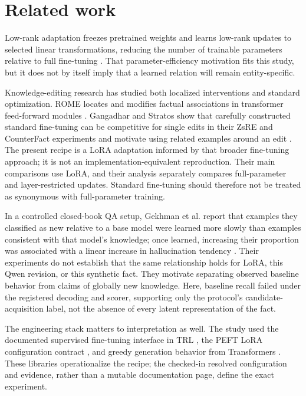 \section{Related work}
\label{sec:related-work}

Low-rank adaptation freezes pretrained weights and learns low-rank updates to
selected linear transformations, reducing the number of trainable parameters
relative to full fine-tuning \citep{hu2021lora}. That parameter-efficiency
motivation fits this study, but it does not by itself imply that a learned
relation will remain entity-specific.

Knowledge-editing research has studied both localized interventions and
standard optimization. ROME locates and modifies factual associations in
transformer feed-forward modules \citep{meng2022rome}. Gangadhar and Stratos
show that carefully constructed standard fine-tuning can be competitive for
single edits in their ZsRE and CounterFact experiments and motivate using
related examples around an edit
\citep{gangadhar2024model}. The present recipe is a LoRA adaptation informed by
that broader fine-tuning approach; it is not an implementation-equivalent
reproduction. Their main comparisons use LoRA, and their analysis separately
compares full-parameter and layer-restricted updates. Standard fine-tuning
should therefore not be treated as synonymous with full-parameter training.

In a controlled closed-book QA setup, Gekhman et al. report that examples they
classified as new relative to a base model were learned more slowly than
examples consistent with that model's knowledge; once learned, increasing their
proportion was associated with a linear increase in hallucination tendency
\citep{gekhman2024hallucinations}. Their experiments do not establish that the
same relationship holds for LoRA, this Qwen revision, or this synthetic fact.
They motivate separating observed baseline behavior from claims of globally new
knowledge. Here, baseline recall failed under the registered decoding and
scorer, supporting only the protocol's candidate-acquisition label, not the
absence of every latent representation of the fact.

The engineering stack matters to interpretation as well. The study used the
documented supervised fine-tuning interface in TRL \citep{trlsft}, the PEFT LoRA
configuration contract \citep{peftlora}, and greedy generation behavior from
Transformers \citep{transformersgeneration}. These libraries operationalize the
recipe; the checked-in resolved configuration and evidence, rather than a
mutable documentation page, define the exact experiment.
